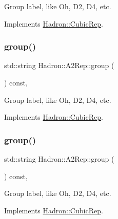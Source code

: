 Group label, like Oh, D2, D4, etc. 

Implements \mbox{\hyperlink{structHadron_1_1CubicRep_a0748f11ec87f387062c8e8981339a29c}{Hadron\+::\+Cubic\+Rep}}.

\mbox{\label{structHadron_1_1A2Rep_a3bc9b6dc8fcd507991dfc7dbad16e7a4}} 
\subsubsection{\texorpdfstring{group()}{group()}\hspace{0.1cm}{\footnotesize\ttfamily [2/3]}}
{\footnotesize\ttfamily std\+::string Hadron\+::\+A2\+Rep\+::group (\begin{DoxyParamCaption}{ }\end{DoxyParamCaption}) const\hspace{0.3cm}{\ttfamily [inline]}, {\ttfamily [virtual]}}

Group label, like Oh, D2, D4, etc. 

Implements \mbox{\hyperlink{structHadron_1_1CubicRep_a0748f11ec87f387062c8e8981339a29c}{Hadron\+::\+Cubic\+Rep}}.

\mbox{\label{structHadron_1_1A2Rep_a3bc9b6dc8fcd507991dfc7dbad16e7a4}} 
\subsubsection{\texorpdfstring{group()}{group()}\hspace{0.1cm}{\footnotesize\ttfamily [3/3]}}
{\footnotesize\ttfamily std\+::string Hadron\+::\+A2\+Rep\+::group (\begin{DoxyParamCaption}{ }\end{DoxyParamCaption}) const\hspace{0.3cm}{\ttfamily [inline]}, {\ttfamily [virtual]}}

Group label, like Oh, D2, D4, etc. 

Implements \mbox{\hyperlink{structHadron_1_1CubicRep_a0748f11ec87f387062c8e8981339a29c}{Hadron\+::\+Cubic\+Rep}}.

\mbox{\label{structHadron_1_1A2Rep_a31e1135ddb204394f1c6153797a7dffa}} 
